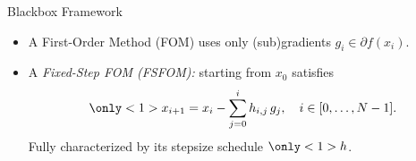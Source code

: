 \documentclass[9pt]{beamer}
\begin{document}
\begin{frame}{Blackbox Framework}
  \vfill

  \begin{itemize}
    
  \item A First-Order Method (FOM) uses only (sub)gradients $g_i\in \partial f(x_i)$.
    
  \item A \emph{Fixed-Step FOM (FSFOM):} starting from $x_0$ satisfies
    \[
      \only<1>{
        x_{i+1} = x_{i} - \sum_{j=0}^{i} h_{i,j} \, g_j, \quad i \in [0, \dots, N-1].}
    \]
    Fully characterized by its stepsize schedule $\only<1>{h}%
    $.
  \end{itemize}
  
\end{frame}
\end{document}
